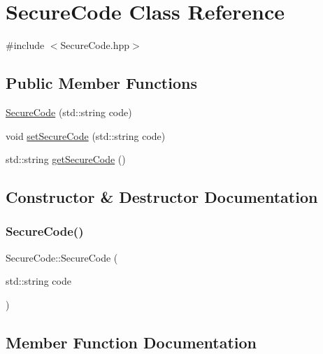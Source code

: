 \hypertarget{class_secure_code}{}\section{Secure\+Code Class Reference}
\label{class_secure_code}


{\ttfamily \#include $<$Secure\+Code.\+hpp$>$}

\subsection*{Public Member Functions}
\begin{DoxyCompactItemize}
\item 
\mbox{\hyperlink{class_secure_code_a438ca6fb3765c40022c9ae20d76040b3}{Secure\+Code}} (std\+::string code)
\item 
void \mbox{\hyperlink{class_secure_code_a7417a7fff51641cd8e5f829af6af7eea}{set\+Secure\+Code}} (std\+::string code)
\item 
std\+::string \mbox{\hyperlink{class_secure_code_a5ead36d45429c9c84d3b9d03b7aef63b}{get\+Secure\+Code}} ()
\end{DoxyCompactItemize}


\subsection{Constructor \& Destructor Documentation}
\mbox{\label{class_secure_code_a438ca6fb3765c40022c9ae20d76040b3}} 
\subsubsection{\texorpdfstring{SecureCode()}{SecureCode()}}
{\footnotesize\ttfamily Secure\+Code\+::\+Secure\+Code (\begin{DoxyParamCaption}\item[{std\+::string}]{code }\end{DoxyParamCaption})}



\subsection{Member Function Documentation}
\mbox{\label{class_secure_code_a5ead36d45429c9c84d3b9d03b7aef63b}} 
